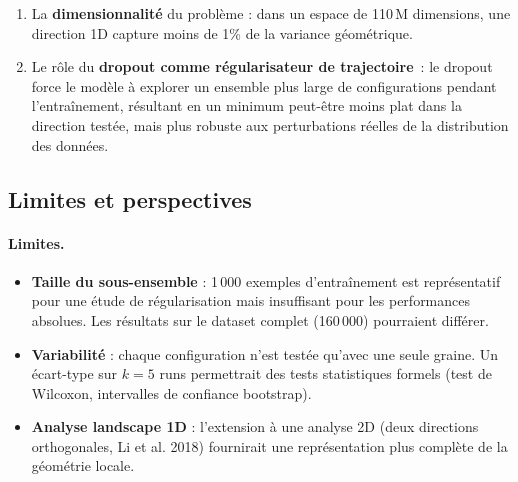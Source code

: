 \documentclass[12pt,a4paper]{article}
\begin{document}
\begin{enumerate}
  \item La \textbf{dimensionnalité} du problème : dans un espace de 110\,M
    dimensions, une direction 1D capture moins de 1\% de la variance géométrique.
  \item Le rôle du \textbf{dropout comme régularisateur de trajectoire}~: le
    dropout force le modèle à explorer un ensemble plus large de configurations
    pendant l'entraînement, résultant en un minimum peut-être moins plat dans
    la direction testée, mais plus robuste aux perturbations réelles de la
    distribution des données.
\end{enumerate}

\subsection{Limites et perspectives}
\label{ssec:limites}

\paragraph{Limites.}
\begin{itemize}
  \item \textbf{Taille du sous-ensemble} : 1\,000 exemples d'entraînement est
    représentatif pour une étude de régularisation mais insuffisant pour les
    performances absolues. Les résultats sur le dataset complet (160\,000)
    pourraient différer.
  \item \textbf{Variabilité} : chaque configuration n'est testée qu'avec une
    seule graine. Un écart-type sur $k=5$ runs permettrait des tests statistiques
    formels (test de Wilcoxon, intervalles de confiance bootstrap).
  \item \textbf{Analyse landscape 1D} : l'extension à une analyse 2D (deux
    directions orthogonales, Li et al. 2018) fournirait une représentation plus
    complète de la géométrie locale.
\end{itemize}
\end{document}

